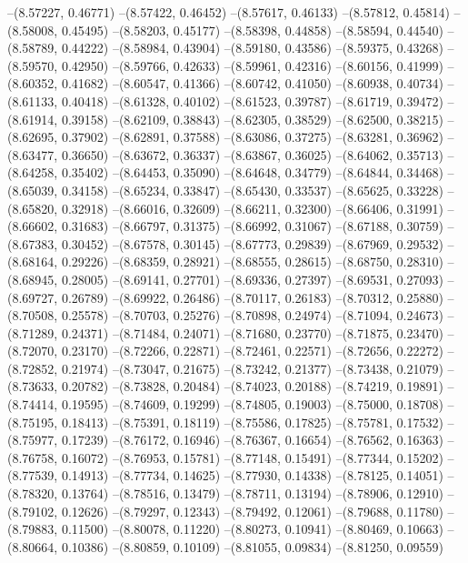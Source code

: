 --(8.57227, 0.46771)
--(8.57422, 0.46452)
--(8.57617, 0.46133)
--(8.57812, 0.45814)
--(8.58008, 0.45495)
--(8.58203, 0.45177)
--(8.58398, 0.44858)
--(8.58594, 0.44540)
--(8.58789, 0.44222)
--(8.58984, 0.43904)
--(8.59180, 0.43586)
--(8.59375, 0.43268)
--(8.59570, 0.42950)
--(8.59766, 0.42633)
--(8.59961, 0.42316)
--(8.60156, 0.41999)
--(8.60352, 0.41682)
--(8.60547, 0.41366)
--(8.60742, 0.41050)
--(8.60938, 0.40734)
--(8.61133, 0.40418)
--(8.61328, 0.40102)
--(8.61523, 0.39787)
--(8.61719, 0.39472)
--(8.61914, 0.39158)
--(8.62109, 0.38843)
--(8.62305, 0.38529)
--(8.62500, 0.38215)
--(8.62695, 0.37902)
--(8.62891, 0.37588)
--(8.63086, 0.37275)
--(8.63281, 0.36962)
--(8.63477, 0.36650)
--(8.63672, 0.36337)
--(8.63867, 0.36025)
--(8.64062, 0.35713)
--(8.64258, 0.35402)
--(8.64453, 0.35090)
--(8.64648, 0.34779)
--(8.64844, 0.34468)
--(8.65039, 0.34158)
--(8.65234, 0.33847)
--(8.65430, 0.33537)
--(8.65625, 0.33228)
--(8.65820, 0.32918)
--(8.66016, 0.32609)
--(8.66211, 0.32300)
--(8.66406, 0.31991)
--(8.66602, 0.31683)
--(8.66797, 0.31375)
--(8.66992, 0.31067)
--(8.67188, 0.30759)
--(8.67383, 0.30452)
--(8.67578, 0.30145)
--(8.67773, 0.29839)
--(8.67969, 0.29532)
--(8.68164, 0.29226)
--(8.68359, 0.28921)
--(8.68555, 0.28615)
--(8.68750, 0.28310)
--(8.68945, 0.28005)
--(8.69141, 0.27701)
--(8.69336, 0.27397)
--(8.69531, 0.27093)
--(8.69727, 0.26789)
--(8.69922, 0.26486)
--(8.70117, 0.26183)
--(8.70312, 0.25880)
--(8.70508, 0.25578)
--(8.70703, 0.25276)
--(8.70898, 0.24974)
--(8.71094, 0.24673)
--(8.71289, 0.24371)
--(8.71484, 0.24071)
--(8.71680, 0.23770)
--(8.71875, 0.23470)
--(8.72070, 0.23170)
--(8.72266, 0.22871)
--(8.72461, 0.22571)
--(8.72656, 0.22272)
--(8.72852, 0.21974)
--(8.73047, 0.21675)
--(8.73242, 0.21377)
--(8.73438, 0.21079)
--(8.73633, 0.20782)
--(8.73828, 0.20484)
--(8.74023, 0.20188)
--(8.74219, 0.19891)
--(8.74414, 0.19595)
--(8.74609, 0.19299)
--(8.74805, 0.19003)
--(8.75000, 0.18708)
--(8.75195, 0.18413)
--(8.75391, 0.18119)
--(8.75586, 0.17825)
--(8.75781, 0.17532)
--(8.75977, 0.17239)
--(8.76172, 0.16946)
--(8.76367, 0.16654)
--(8.76562, 0.16363)
--(8.76758, 0.16072)
--(8.76953, 0.15781)
--(8.77148, 0.15491)
--(8.77344, 0.15202)
--(8.77539, 0.14913)
--(8.77734, 0.14625)
--(8.77930, 0.14338)
--(8.78125, 0.14051)
--(8.78320, 0.13764)
--(8.78516, 0.13479)
--(8.78711, 0.13194)
--(8.78906, 0.12910)
--(8.79102, 0.12626)
--(8.79297, 0.12343)
--(8.79492, 0.12061)
--(8.79688, 0.11780)
--(8.79883, 0.11500)
--(8.80078, 0.11220)
--(8.80273, 0.10941)
--(8.80469, 0.10663)
--(8.80664, 0.10386)
--(8.80859, 0.10109)
--(8.81055, 0.09834)
--(8.81250, 0.09559)
